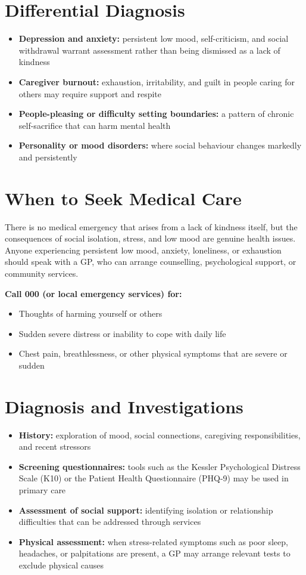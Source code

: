 \section*{Differential Diagnosis}
\begin{itemize}
    \item \textbf{Depression and anxiety:} persistent low mood, self-criticism, and social withdrawal warrant assessment rather than being dismissed as a lack of kindness
    \item \textbf{Caregiver burnout:} exhaustion, irritability, and guilt in people caring for others may require support and respite
    \item \textbf{People-pleasing or difficulty setting boundaries:} a pattern of chronic self-sacrifice that can harm mental health
    \item \textbf{Personality or mood disorders:} where social behaviour changes markedly and persistently
\end{itemize}

\section*{When to Seek Medical Care}
There is no medical emergency that arises from a lack of kindness itself, but the consequences of social isolation, stress, and low mood are genuine health issues. Anyone experiencing persistent low mood, anxiety, loneliness, or exhaustion should speak with a GP, who can arrange counselling, psychological support, or community services.

\textbf{Call 000 (or local emergency services) for:}
\begin{itemize}
    \item Thoughts of harming yourself or others
    \item Sudden severe distress or inability to cope with daily life
    \item Chest pain, breathlessness, or other physical symptoms that are severe or sudden
\end{itemize}

\section*{Diagnosis and Investigations}
\begin{itemize}
    \item \textbf{History:} exploration of mood, social connections, caregiving responsibilities, and recent stressors
    \item \textbf{Screening questionnaires:} tools such as the Kessler Psychological Distress Scale (K10) or the Patient Health Questionnaire (PHQ-9) may be used in primary care
    \item \textbf{Assessment of social support:} identifying isolation or relationship difficulties that can be addressed through services
    \item \textbf{Physical assessment:} when stress-related symptoms such as poor sleep, headaches, or palpitations are present, a GP may arrange relevant tests to exclude physical causes
\end{itemize}

